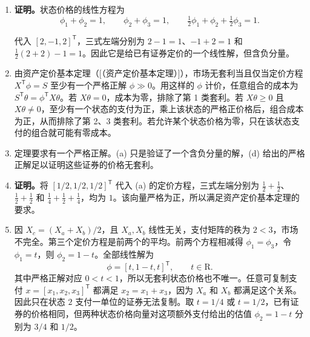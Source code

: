 \begin{solution}[blank-type=manual,blank-vsep=9\baselineskip]
\begin{enumerate}[label=(\alph*)]
    \item \textbf{证明。}状态价格的线性方程为
    \[
       \phi_1+\phi_2=1,\qquad\phi_2+\phi_3=1,\qquad
       \tfrac12\phi_1+\phi_2+\tfrac12\phi_3=1.
    \]

    代入 $[2,-1,2]^{\mathsf T}$，三式左端分别为 $2-1=1$、$-1+2=1$ 和 $\tfrac12(2+2)-1=1$。因此它是给已有证券定价的一个线性解，但含负分量。

    \item 由资产定价基本定理\ifdefined\WJHandoutKnowledge（[（资产定价基本定理）]）\fi，市场无套利当且仅当定价方程 $X^{\mathsf T}\phi=S$ 至少有一个严格正解 $\phi\gg0$。用这样的 $\phi$ 计价，任意组合的成本为 $S^{\mathsf T}\theta=\phi^{\mathsf T}X\theta$。若 $X\theta=0$，成本为零，排除了第 1 类套利。若 $X\theta\ge0$ 且 $X\theta\ne0$，至少有一个状态的支付为正，乘上该状态的严格正价格后，组合成本为正，从而排除了第 2、3 类套利。若允许某个状态价格为零，只在该状态支付的组合就可能有零成本。

    \item 定理要求有一个严格正解。(a) 只是验证了一个含负分量的解，(d) 给出的严格正解足以证明这些证券的价格无套利。

    \item \textbf{证明。}将 $[1/2,1/2,1/2]^{\mathsf T}$ 代入 (a) 的定价方程，三式左端分别为 $\tfrac12+\tfrac12$、$\tfrac12+\tfrac12$ 和 $\tfrac14+\tfrac12+\tfrac14$，均为 $1$。该向量严格为正，所以满足资产定价基本定理的要求。

    \item 因 $X_c=(X_a+X_b)/2$，且 $X_a,X_b$ 线性无关，支付矩阵的秩为 $2<3$，市场不完全。第三个定价方程是前两个的平均。前两个方程相减得 $\phi_1=\phi_3$，令 $\phi_1=t$，则 $\phi_2=1-t$。全部线性解为
    \[
       \phi=[t,1-t,t]^{\mathsf T},\qquad t\in\mathrm R.
    \]
    其中严格正解对应 $0<t<1$，所以无套利状态价格也不唯一。任意可复制支付 $x=[x_1,x_2,x_3]^{\mathsf T}$ 都满足 $x_2=x_1+x_3$，因为 $X_a$ 和 $X_b$ 都满足这个关系。因此只在状态 $2$ 支付一单位的证券无法复制。取 $t=1/4$ 或 $t=1/2$，已有证券的价格相同，但两种状态价格向量对这项额外支付给出的估值 $\phi_2=1-t$ 分别为 $3/4$ 和 $1/2$。\qedhere
\end{enumerate}
\end{solution}

